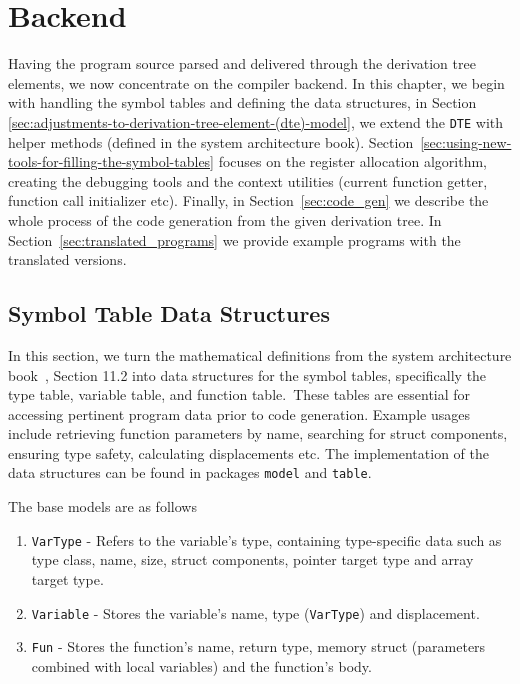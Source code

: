 \chapter{Backend}\label{ch:backend}
Having the program source parsed and delivered through the derivation tree elements, we now
concentrate on the compiler backend.
In this chapter, we begin with handling the symbol tables and defining the data structures, in Section
\ref{sec:adjustments-to-derivation-tree-element-(dte)-model}, we extend the \verb+DTE+
with helper methods (defined in the system architecture book).
Section~\ref{sec:using-new-tools-for-filling-the-symbol-tables} focuses on the register allocation algorithm,
creating the debugging tools and the context utilities (current function getter, function call initializer etc).
Finally, in Section~\ref{sec:code_gen} we describe the whole process of the code generation from the given derivation tree.
In Section~\ref{sec:translated_programs} we provide example programs with the translated versions.


\section{Symbol Table Data Structures}\label{sec:symbol_table_models}
In this section, we turn the mathematical definitions from the system architecture book~\cite{sysbook}, Section 11.2 into data structures for the symbol tables, specifically the type table, variable table, and function table.\
These tables are essential for accessing pertinent program data prior to code generation.
Example usages include retrieving function parameters by name, searching for struct components, ensuring type safety, calculating displacements etc.
The implementation of the data structures can be found in packages \verb+model+ and \verb+table+.

The base models are as follows
\begin{enumerate}
    \item \verb+VarType+ - Refers to the variable's type, containing type-specific data such as type class, name,
    size, struct components, pointer target type and array target type.
    \item \verb+Variable+ - Stores the variable's name, type (\verb+VarType+) and displacement.
    \item \verb+Fun+ - Stores the function's name, return type, memory struct (parameters combined with local variables) and the function's body.
\end{enumerate}


